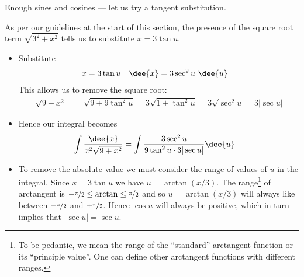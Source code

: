 Enough sines and cosines --- let us try a tangent substitution.
\begin{eg}\label{eg:INVTRIGb}
\soln As per our guidelines at the start of this section, the presence of the square root
term $\sqrt{3^2+x^2}$ tells us to substitute $x=3\tan u$.
\begin{itemize}
 \item Substitute
\begin{align*}
x&=3\tan u &
\dee{x} &= 3\sec^2 u\ \dee{u}
\end{align*}
This allows us to remove the square root:
\begin{align*}
\sqrt{9+x^2}
&=\sqrt{9+9\tan^2u}
=3\sqrt{1+\tan^2u}
=3\sqrt{\sec^2 u}
=3|\sec u|
\end{align*}
\item Hence our integral becomes
\begin{align*}
 \int \frac{\dee{x}}{x^2\sqrt{9+x^2}}
  &= \int \frac{3\sec^2 u}{9\tan^2u \cdot 3|\sec u|} \dee{u}
\end{align*}

\item To remove the absolute value we must consider the range of values of $u$ in
the integral. Since $x=3\tan u$ we have $u = \arctan(x/3)$. The range\footnote{To be
pedantic, we mean the range of the ``standard'' arctangent function or its ``principle
value''. One can define other arctangent functions with different ranges.} of arctangent
is $-\nicefrac{\pi}{2} \leq \arctan  \leq \nicefrac{\pi}{2}$ and so $u=\arctan(x/3)$
will always like between $-\nicefrac{\pi}{2}$ and $+\nicefrac{\pi}{2}$. Hence $\cos u$
will always be positive, which in turn implies that $|\sec u|=\sec u$.


\end{itemize}
\end{eg}
